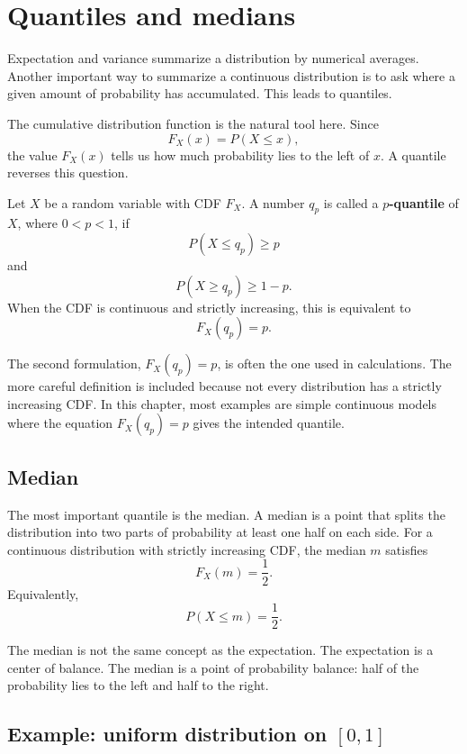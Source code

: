 \section{Quantiles and medians}

Expectation and variance summarize a distribution by numerical averages. Another
important way to summarize a continuous distribution is to ask where a given
amount of probability has accumulated. This leads to quantiles.

The cumulative distribution function is the natural tool here. Since
\[
F_X(x)=P(X\leq x),
\]
the value \(F_X(x)\) tells us how much probability lies to the left of \(x\).
A quantile reverses this question.

\begin{definitionbox}
Let \(X\) be a random variable with CDF \(F_X\). A number \(q_p\) is called a
\textbf{\(p\)-quantile} of \(X\), where \(0<p<1\), if
\[
P(X\leq q_p)\geq p
\]
and
\[
P(X\geq q_p)\geq 1-p.
\]
When the CDF is continuous and strictly increasing, this is equivalent to
\[
F_X(q_p)=p.
\]
\end{definitionbox}

The second formulation, \(F_X(q_p)=p\), is often the one used in calculations.
The more careful definition is included because not every distribution has a
strictly increasing CDF. In this chapter, most examples are simple continuous
models where the equation \(F_X(q_p)=p\) gives the intended quantile.

\subsection*{Median}

The most important quantile is the median. A median is a point that splits the
distribution into two parts of probability at least one half on each side. For a
continuous distribution with strictly increasing CDF, the median \(m\) satisfies
\[
F_X(m)=\frac12.
\]
Equivalently,
\[
P(X\leq m)=\frac12.
\]

The median is not the same concept as the expectation. The expectation is a
center of balance. The median is a point of probability balance: half of the
probability lies to the left and half to the right.

\subsection*{Example: uniform distribution on \([0,1]\)}

